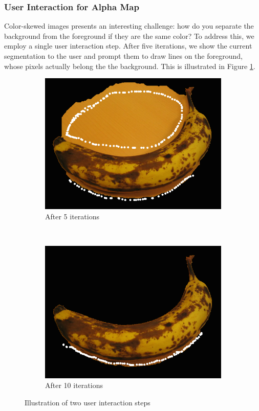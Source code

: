 \documentclass[10pt,twocolumn,letterpaper]{article}
\begin{document}
\subsubsection{User Interaction for Alpha Map}

Color-skewed images presents an interesting challenge: how do you separate the background from the foreground if they are the same color? To address this, we employ a single user interaction step. After five iterations, we show the current segmentation to the user and prompt them to draw lines on the foreground, whose pixels actually belong the the background. This is illustrated in Figure \ref{fig:user_interaction}.

\begin{figure}[t]
\centering
\begin{subfigure}[b]{0.48\linewidth}
        \includegraphics[width=1.0\linewidth]{figures/banana1_ui1.png}
        \caption{After 5 iterations}
\end{subfigure}%
~
\begin{subfigure}[b]{0.48\linewidth}
        \includegraphics[width=1.0\linewidth]{figures/banana1_ui2.png}
        \caption{After 10 iterations}
\end{subfigure}%
\vspace{-2mm}
\caption{Illustration of two user interaction steps}
\label{fig:user_interaction}
\end{figure}
\end{document}
